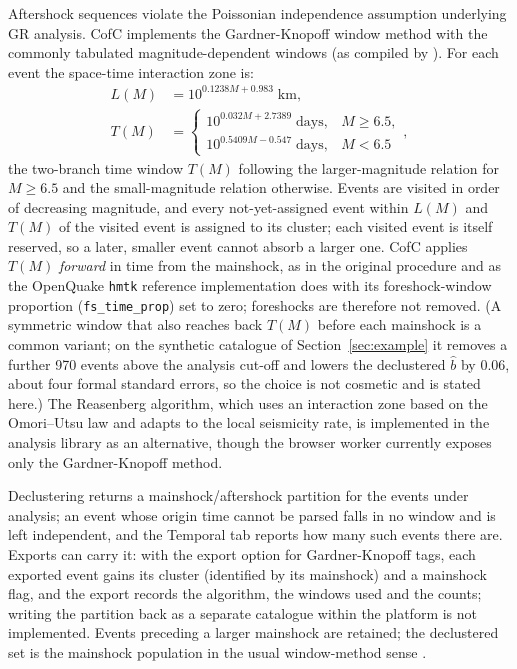 \documentclass[12pt]{article}
\begin{document}
Aftershock sequences violate the Poissonian independence assumption underlying
GR analysis.  CofC implements the Gardner-Knopoff window method
\citep{gardner1974} with the commonly tabulated magnitude-dependent windows
(as compiled by \citealt{vanstiphout2012}).  For each event the space-time
interaction zone is:
\begin{align}
  L(M)  &= 10^{0.1238M + 0.983}\;\text{km}, \label{eq:gk_L}\\
  T(M)  &= \begin{cases}
            10^{0.032M + 2.7389}\;\text{days}, & M \geq 6.5, \\
            10^{0.5409M - 0.547}\;\text{days}, & M < 6.5
           \end{cases}, \label{eq:gk_T}
\end{align}
the two-branch time window $T(M)$ following the larger-magnitude relation for
$M \geq 6.5$ and the small-magnitude relation otherwise.  Events are visited in
order of decreasing magnitude, and every not-yet-assigned event within $L(M)$ and
$T(M)$ of the visited event is assigned to its cluster; each visited event is
itself reserved, so a later, smaller event cannot absorb a larger one.  CofC
applies $T(M)$ \emph{forward} in time from the mainshock, as in the original
\citet{gardner1974} procedure and as the OpenQuake \texttt{hmtk} reference
implementation does with its foreshock-window proportion
(\texttt{fs\_time\_prop}) set to zero; foreshocks are therefore not removed.  (A
symmetric window that also reaches back $T(M)$ before each mainshock is a
common variant; on the synthetic catalogue of Section~\ref{sec:example} it
removes a further 970 events above the analysis cut-off and lowers the
declustered $\hat{b}$ by $0.06$, about four formal standard errors, so the
choice is not cosmetic and is stated here.)  The Reasenberg
\citeyearpar{reasenberg1985} algorithm, which uses an interaction zone based on
the Omori--Utsu law \citep{omori1894,utsu1961} and adapts to the local
seismicity rate, is implemented in the analysis library as an alternative,
though the browser worker currently exposes only the Gardner-Knopoff method.

Declustering returns a mainshock/aftershock partition for the events under
analysis; an event whose origin time cannot be parsed falls in no window and is
left independent, and the Temporal tab reports how many such events there are.
Exports can carry it: with the export option for Gardner-Knopoff
tags, each exported event gains its cluster (identified by its mainshock) and a
mainshock flag, and the export records the algorithm, the windows used and the
counts; writing the partition back as a separate catalogue within the platform
is not implemented.  Events preceding a larger mainshock are retained; the
declustered set is the mainshock population in the usual window-method sense
\citep{vanstiphout2012}.
\end{document}
